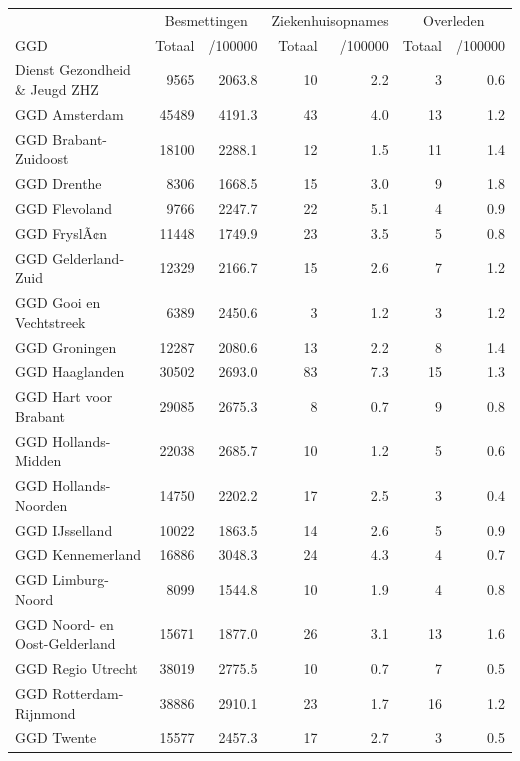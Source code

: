 \documentclass[
  english,
  man,floatsintext]{apa6}
\begin{document}
\begin{table}
\centering\begingroup\fontsize{10}{12}\selectfont

\begin{threeparttable}
\begin{tabular}{lrrrrrr}
\toprule
\multicolumn{1}{c}{ } & \multicolumn{2}{c}{Besmettingen} & \multicolumn{2}{c}{Ziekenhuisopnames} & \multicolumn{2}{c}{Overleden} \\
\cmidrule(l{3pt}r{3pt}){2-3} \cmidrule(l{3pt}r{3pt}){4-5} \cmidrule(l{3pt}r{3pt}){6-7}
GGD & Totaal & /100000 & Totaal & /100000 & Totaal & /100000\\
\midrule
Dienst Gezondheid \& Jeugd ZHZ & 9565 & 2063.8 & 10 & 2.2 & 3 & 0.6\\
GGD Amsterdam & 45489 & 4191.3 & 43 & 4.0 & 13 & 1.2\\
GGD Brabant-Zuidoost & 18100 & 2288.1 & 12 & 1.5 & 11 & 1.4\\
GGD Drenthe & 8306 & 1668.5 & 15 & 3.0 & 9 & 1.8\\
GGD Flevoland & 9766 & 2247.7 & 22 & 5.1 & 4 & 0.9\\
GGD FryslÃ¢n & 11448 & 1749.9 & 23 & 3.5 & 5 & 0.8\\
GGD Gelderland-Zuid & 12329 & 2166.7 & 15 & 2.6 & 7 & 1.2\\
GGD Gooi en Vechtstreek & 6389 & 2450.6 & 3 & 1.2 & 3 & 1.2\\
GGD Groningen & 12287 & 2080.6 & 13 & 2.2 & 8 & 1.4\\
GGD Haaglanden & 30502 & 2693.0 & 83 & 7.3 & 15 & 1.3\\
GGD Hart voor Brabant & 29085 & 2675.3 & 8 & 0.7 & 9 & 0.8\\
GGD Hollands-Midden & 22038 & 2685.7 & 10 & 1.2 & 5 & 0.6\\
GGD Hollands-Noorden & 14750 & 2202.2 & 17 & 2.5 & 3 & 0.4\\
GGD IJsselland & 10022 & 1863.5 & 14 & 2.6 & 5 & 0.9\\
GGD Kennemerland & 16886 & 3048.3 & 24 & 4.3 & 4 & 0.7\\
GGD Limburg-Noord & 8099 & 1544.8 & 10 & 1.9 & 4 & 0.8\\
GGD Noord- en Oost-Gelderland & 15671 & 1877.0 & 26 & 3.1 & 13 & 1.6\\
GGD Regio Utrecht & 38019 & 2775.5 & 10 & 0.7 & 7 & 0.5\\
GGD Rotterdam-Rijnmond & 38886 & 2910.1 & 23 & 1.7 & 16 & 1.2\\
GGD Twente & 15577 & 2457.3 & 17 & 2.7 & 3 & 0.5\\

\end{tabular}
\end{threeparttable}
\end{table}
\end{document}
